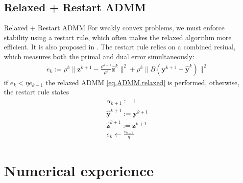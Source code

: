 \documentclass[8pt,red]{beamer}
\theoremstyle{plain}
\theoremstyle{definition}
\theoremstyle{remark}
\newcommand{\bi}[1]{\ensuremath{\boldsymbol{#1}}}
\begin{document}
\subsection{Relaxed + Restart ADMM}
\begin{frame}{Relaxed + Restart ADMM}
For weakly convex problems, we must enforce stability using a restart rule, which often makes the relaxed algorithm more efficient. It is also proposed in \citep{goldstein2014fast}. The restart rule relies on a combined resiual, which measures both the primal and dual error simultaneously:
\begin{align}
	e_{k}
    := \rho^{k} \| \bi{z}^{k+1} - \frac{\rho^{k-1}}{\rho^{k}} \hat{\bi{z}}^{k} \|^{2}
    + \rho^{k} \| B (\bi{y}^{k+1} - \hat{\bi{y}}^{k}) \|^{2}
\end{align}
if $e_{k} < \eta e_{k-1}$ the relaxed ADMM \eqref{eq.ADMM.relaxed} is performed, otherwise, the restart rule states
\begin{subequations}\label{eq.ADMM.restart}%
  \begin{alignat}{3}
    \alpha_{k+1} := 1 \\
    \hat{\bi{y}}^{k+1}
    := \bi{y}^{k+1} \\
    \hat{\bi{z}}^{k+1}
    := \bi{z}^{k+1} \\
    e_{k} \leftarrow \frac{e_{k-1}}{\eta}
  \end{alignat}
\end{subequations}
\end{frame}

\section{Numerical experience}

\end{document}
